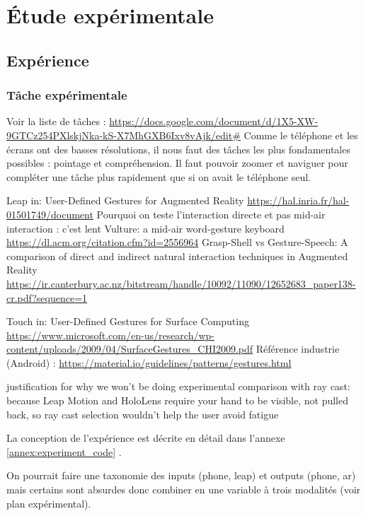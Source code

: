 \chapter{Étude expérimentale}
\label{ch:experiment}

\section{Expérience}
\subsection{Tâche expérimentale}
\label{sec:experiment_description}

Voir la liste de tâches : \url{https://docs.google.com/document/d/1X5-XW-9GTCz254PXlskjNka-kS-X7MhGXB6Ixv8vAjk/edit#}
Comme le téléphone et les écrans ont des basses résolutions, il nous faut des tâches les plus fondamentales possibles : pointage et compréhension. Il faut pouvoir zoomer et naviguer pour compléter une tâche plus rapidement que si on avait le téléphone seul.


Leap in:
User-Defined Gestures for Augmented Reality \url{https://hal.inria.fr/hal-01501749/document}
Pourquoi on teste l'interaction directe et pas mid-air interaction : c'est lent Vulture: a mid-air word-gesture keyboard \url{https://dl.acm.org/citation.cfm?id=2556964}
Grasp-Shell vs Gesture-Speech: A comparison of direct and indirect natural interaction
techniques in Augmented Reality \url{https://ir.canterbury.ac.nz/bitstream/handle/10092/11090/12652683_paper138-cr.pdf?sequence=1}

Touch in:
User-Defined Gestures for Surface Computing \url{https://www.microsoft.com/en-us/research/wp-content/uploads/2009/04/SurfaceGestures_CHI2009.pdf}
Référence industrie (Android) : \url{https://material.io/guidelines/patterns/gestures.html}

justification for why we won’t be doing experimental comparison with ray cast: because Leap Motion and HoloLens require your hand to be visible, not pulled back, so ray cast selection wouldn’t help the user avoid fatigue

La conception de l'expérience est décrite en détail dans l'annexe \ref{annex:experiment_code} .

On pourrait faire une taxonomie des inputs (phone, leap) et outputs (phone, ar) mais certains sont absurdes donc combiner en une variable à trois modalités (voir plan expérimental).


